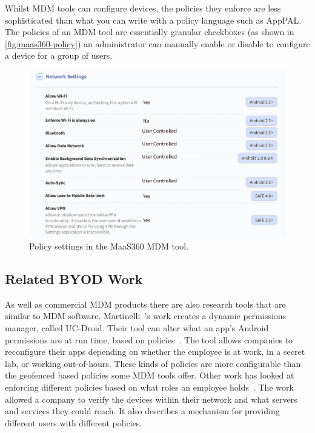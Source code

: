 \documentclass[thesis.tex]{subfiles}
\begin{document}
Whilst \ac{MDM} tools can configure devices, the policies they enforce are less
sophisticated than what you can write with a policy language such as AppPAL. The
policies of an \ac{MDM} tool are essentially granular checkboxes (as shown in
\autoref{fig:maas360-policy}) an administrator can manually enable or disable to
configure a device for a group of users.

\begin{figure}
  \centering
  \includegraphics[width=\textwidth]{figures/maas360-policy.png}
  \caption{Policy settings in the MaaS360 MDM tool.}
  \label{fig:maas360-policy}
\end{figure}

\subsection{Related BYOD Work}

As well as commercial \ac{MDM} products there are also research tools
that are similar to \ac{MDM} software. Martinelli~\etal{}'s work
creates a dynamic permissions manager, called UC-Droid. Their tool can
alter what an app's Android permissions are at run time, based on
policies~\cite{martinelli_enhancing_2016}.  The tool allows companies
to reconfigure their apps depending on whether the employee is at
work, in a secret lab, or working out-of-hours. These kinds of
policies are more configurable than the geofenced based policies some
\ac{MDM} tools offer. Other work has looked at enforcing different
policies based on what roles an employee
holds~\cite{costantino_towards_2013}. The work allowed a company to
verify the devices within their network and what servers and services
they could reach. It also describes a mechanism for providing
different users with different policies.
\end{document}
